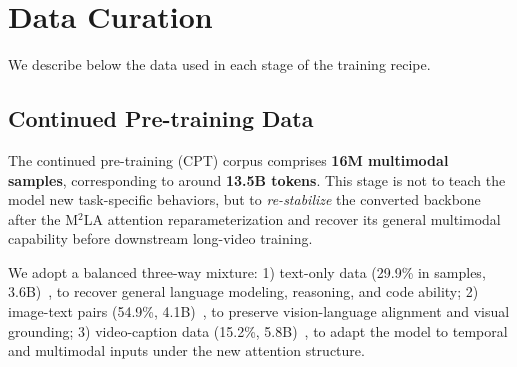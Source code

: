 \documentclass[11pt, letterpaper]{template}
\theoremstyle{plain}
\theoremstyle{definition}
\theoremstyle{remark}
\begin{document}
\section{Data Curation}

We describe below the data used in each stage of the training recipe.

\subsection{Continued Pre-training Data}

The continued pre-training (CPT) corpus comprises \textbf{16M multimodal samples}, corresponding to around \textbf{13.5B tokens}. This stage is not to teach the model new task-specific behaviors, but to \emph{re-stabilize} the converted backbone after the M$^2$LA attention reparameterization and recover its general multimodal capability before downstream long-video training.

We adopt a balanced three-way mixture: 1) text-only data (29.9\% in samples, 3.6B)~\citep{wang2025scireasoner,kuckreja2024geochat,yu2024metamath,hendrycks2020measuring,wei2024measuring}, to recover general language modeling, reasoning, and code ability; 2) image-text pairs (54.9\%, 4.1B)~\citep{Llava-onevision,marti2002iam,yu2016refcoco,hudson2019gqa}, to preserve vision-language alignment and visual grounding; 3) video-caption data (15.2\%, 5.8B)~\citep{zhang2024llava,Maaz2024VideoGPT+,wiedmann2025finevision,yang2025cambrian,wang2023internvid,clark2026molmo2}, to adapt the model to temporal and multimodal inputs under the new attention structure.
\end{document}
